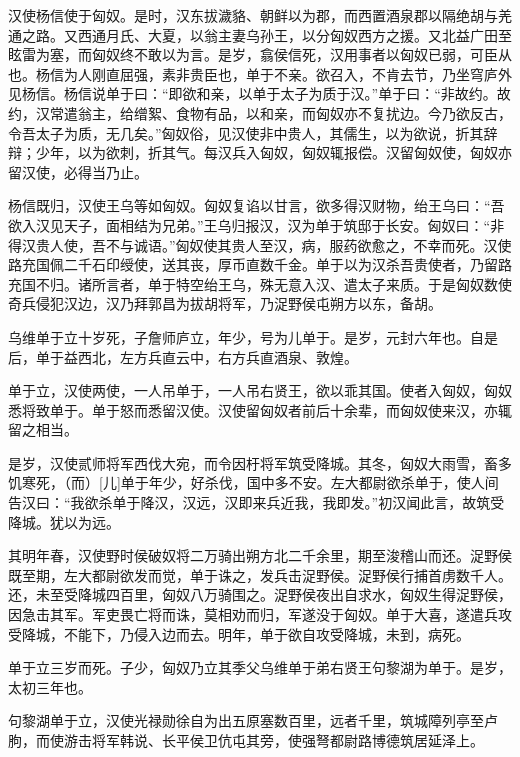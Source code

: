 \documentclass[12pt,UTF8]{ctexbook}
\begin{document}
汉使杨信使于匈奴。是时，汉东拔濊貉、朝鲜以为郡，而西置酒泉郡以隔绝胡与羌通之路。又西通月氏、大夏，以翁主妻乌孙王，以分匈奴西方之援。又北益广田至眩雷为塞，而匈奴终不敢以为言。是岁，翕侯信死，汉用事者以匈奴已弱，可臣从也。杨信为人刚直屈强，素非贵臣也，单于不亲。欲召入，不肯去节，乃坐穹庐外见杨信。杨信说单于曰：“即欲和亲，以单于太子为质于汉。”单于曰：“非故约。故约，汉常遣翁主，给缯絮、食物有品，以和亲，而匈奴亦不复扰边。今乃欲反古，令吾太子为质，无几矣。”匈奴俗，见汉使非中贵人，其儒生，以为欲说，折其辞辩；少年，以为欲刺，折其气。每汉兵入匈奴，匈奴辄报偿。汉留匈奴使，匈奴亦留汉使，必得当乃止。



杨信既归，汉使王乌等如匈奴。匈奴复谄以甘言，欲多得汉财物，绐王乌曰：“吾欲入汉见天子，面相结为兄弟。”王乌归报汉，汉为单于筑邸于长安。匈奴曰：“非得汉贵人使，吾不与诚语。”匈奴使其贵人至汉，病，服药欲愈之，不幸而死。汉使路充国佩二千石印绶使，送其丧，厚币直数千金。单于以为汉杀吾贵使者，乃留路充国不归。诸所言者，单于特空绐王乌，殊无意入汉、遣太子来质。于是匈奴数使奇兵侵犯汉边，汉乃拜郭昌为拔胡将军，乃浞野侯屯朔方以东，备胡。



乌维单于立十岁死，子詹师庐立，年少，号为儿单于。是岁，元封六年也。自是后，单于益西北，左方兵直云中，右方兵直酒泉、敦煌。



单于立，汉使两使，一人吊单于，一人吊右贤王，欲以乖其国。使者入匈奴，匈奴悉将致单于。单于怒而悉留汉使。汉使留匈奴者前后十余辈，而匈奴使来汉，亦辄留之相当。



是岁，汉使贰师将军西伐大宛，而令因杅将军筑受降城。其冬，匈奴大雨雪，畜多饥寒死，（而）[儿]单于年少，好杀伐，国中多不安。左大都尉欲杀单于，使人间告汉曰：“我欲杀单于降汉，汉远，汉即来兵近我，我即发。”初汉闻此言，故筑受降城。犹以为远。



其明年春，汉使野时侯破奴将二万骑出朔方北二千余里，期至浚稽山而还。浞野侯既至期，左大都尉欲发而觉，单于诛之，发兵击浞野侯。浞野侯行捕首虏数千人。还，未至受降城四百里，匈奴八万骑围之。浞野侯夜出自求水，匈奴生得浞野侯，因急击其军。军吏畏亡将而诛，莫相劝而归，军遂没于匈奴。单于大喜，遂遣兵攻受降城，不能下，乃侵入边而去。明年，单于欲自攻受降城，未到，病死。



单于立三岁而死。子少，匈奴乃立其季父乌维单于弟右贤王句黎湖为单于。是岁，太初三年也。



句黎湖单于立，汉使光禄勋徐自为出五原塞数百里，远者千里，筑城障列亭至卢朐，而使游击将军韩说、长平侯卫伉屯其旁，使强弩都尉路博德筑居延泽上。
\end{document}
